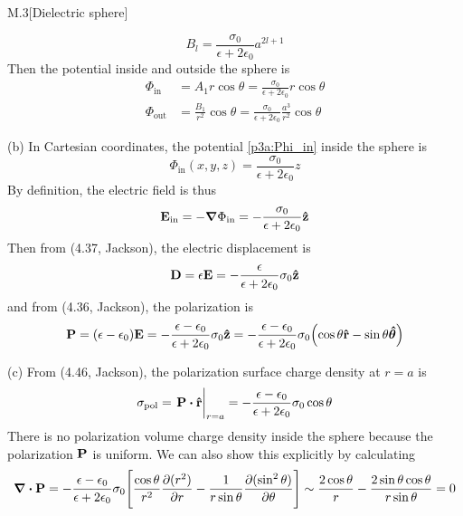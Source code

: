 \documentclass[12pt]{article}
\begin{document}
\begin{problem}{M.3}[Dielectric sphere]
\begin{solution}
\begin{equation}
    B_l=\frac{\sigma_0}{\epsilon+2\epsilon_0}a^{2l+1}
\end{equation}
Then the potential inside and outside the sphere is
\begin{subequations}
    \begin{align}
        \Phi_{\text{in}}&=
        A_1r\cos\theta=\frac{\sigma_0}{\epsilon+2\epsilon_0}r\cos\theta
        \label{p3a:Phi_in}\\
        \Phi_{\text{out}}
        &=\frac{B_1}{r^2}\cos\theta
        =\frac{\sigma_0}{\epsilon+2\epsilon_0}\frac{a^3}{r^2}\cos\theta
    \end{align} 
\end{subequations}

(b) In Cartesian coordinates, the potential \eqref{p3a:Phi_in} inside the 
sphere is
\begin{equation}
    \Phi_{\text{in}}(x,y,z)=\frac{\sigma_0}{\epsilon+2\epsilon_0}z 
\end{equation}
By definition, the electric field is thus
\begin{equation}
    \vb{E}_{\text{in}}=-\grad\Phi_{\text{in}}=-\frac{\sigma_0}{\epsilon+2\epsilon_0}\vb{\hat{z}} 
\end{equation}
Then from (4.37, Jackson), the electric displacement is
\begin{equation}
    \vb{D}=\epsilon\vb{E}=-\frac{\epsilon}{\epsilon+2\epsilon_0}\sigma_0\vb{\hat{z}} 
\end{equation}
and from (4.36, Jackson), the polarization is
\begin{equation}
    \vb{P}=\qty(\epsilon-\epsilon_0)\vb{E}
    =-\frac{\epsilon-\epsilon_0}{\epsilon+2\epsilon_0}\sigma_0\vb{\hat{z}}
    =-\frac{\epsilon-\epsilon_0}{\epsilon+2\epsilon_0}\sigma_0
    \qty(\cos\theta\vb{\hat{r}}-\sin\theta\bm{\hat{\theta}})
\end{equation}

(c) From (4.46, Jackson), the polarization surface charge density at $r=a$ is
\begin{equation}
    \sigma_{\text{pol}}=\eval{\vb{P}\vdot\rhat}_{r=a}
    =-\frac{\epsilon-\epsilon_0}{\epsilon+2\epsilon_0}\sigma_0\cos\theta
\end{equation}
There is no polarization volume charge density inside the sphere because the
polarization $\vb{P}$ is uniform. We can also show this explicitly by
calculating
\begin{equation}
    \div{\vb{P}}=-\frac{\epsilon-\epsilon_0}{\epsilon+2\epsilon_0}\sigma_0
    \qty[\frac{\cos\theta}{r^2}\frac{\partial(r^2)}{\partial
    r}-\frac1{r\sin\theta}\frac{\partial(\sin^2\theta)}{\partial\theta}]
    \sim\frac{2\cos\theta}{r}-\frac{2\sin\theta\cos\theta}{r\sin\theta}
    =0
\end{equation}
\end{solution}
\end{problem}
\end{document}
